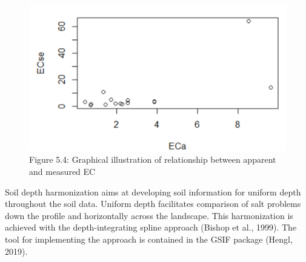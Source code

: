 \documentclass[
  10pt,
  b5paper,
]{book}
\newenvironment{Shaded}{\begin{snugshade}}{\end{snugshade}}
\newcommand{\CommentTok}[1]{\textcolor[rgb]{0.56,0.35,0.01}{\textit{#1}}}
\newcommand{\DataTypeTok}[1]{\textcolor[rgb]{0.13,0.29,0.53}{#1}}
\newcommand{\DecValTok}[1]{\textcolor[rgb]{0.00,0.00,0.81}{#1}}
\newcommand{\FloatTok}[1]{\textcolor[rgb]{0.00,0.00,0.81}{#1}}
\newcommand{\KeywordTok}[1]{\textcolor[rgb]{0.13,0.29,0.53}{\textbf{#1}}}
\newcommand{\NormalTok}[1]{#1}
\newcommand{\OperatorTok}[1]{\textcolor[rgb]{0.81,0.36,0.00}{\textbf{#1}}}
\newcommand{\StringTok}[1]{\textcolor[rgb]{0.31,0.60,0.02}{#1}}
\begin{document}
\begin{Shaded}
\end{Shaded}

\begin{figure}
\centering
\includegraphics{figures/images/Figure5.4.PNG}
\caption{Figure 5.4: Graphical illustration of relationship between apparent and measured EC}
\end{figure}

Soil depth harmonization aims at developing soil information for uniform depth throughout the soil data. Uniform depth facilitates comparison of salt problems down the profile and horizontally across the landscape. This harmonization is achieved with the depth-integrating spline approach (Bishop et al., 1999). The tool for implementing the approach is contained in the GSIF package (Hengl, 2019).
\end{document}
